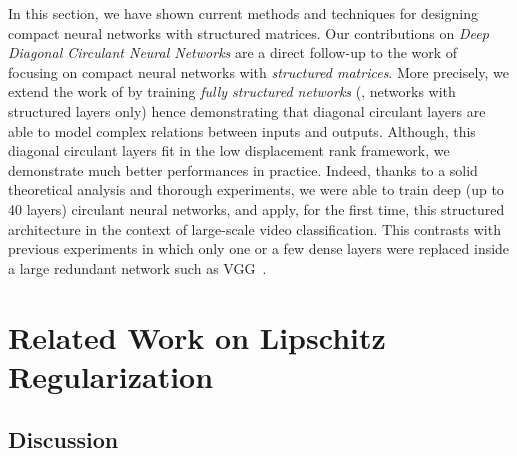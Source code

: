 In this section, we have shown current methods and techniques for designing compact neural networks with structured matrices. 
Our contributions on \emph{Deep Diagonal Circulant Neural Networks} are a direct follow-up to the work of~\citet{cheng2015exploration,sindhwani2015structured,moczulski2016acdc,thomas2018learning} focusing on compact neural networks with \emph{structured matrices}.
More precisely, we extend the work of \citet{moczulski2016acdc} by training \emph{fully structured networks} (\ie, networks with structured layers only) hence demonstrating that diagonal circulant layers are able to model complex relations between inputs and outputs.
Although, this diagonal circulant layers fit in the low displacement rank framework, we demonstrate much better performances in practice.
Indeed, thanks to a solid theoretical analysis and thorough experiments, we were able to train deep (up to 40 layers) circulant neural networks, and apply, for the first time, this structured architecture in the context of large-scale video classification.
This contrasts with previous experiments in which only one or a few dense layers were replaced inside a large redundant network such as VGG~\cite{simonyan2014very}.

\pagebreak

\section{Related Work on Lipschitz Regularization}
\label{section:ch3-related_work_on_lipschitz_regularization}


\subsection{Discussion}

